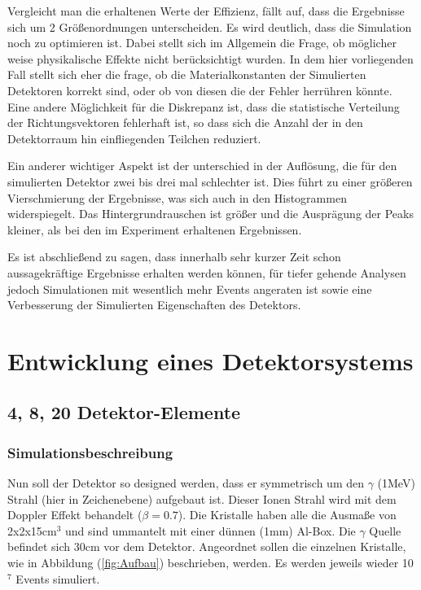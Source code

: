 \documentclass[a4paper,14pt,twoside]{article}
\begin{document}
Vergleicht man die erhaltenen Werte der Effizienz, fällt auf, dass die Ergebnisse sich um 2 Größenordnungen unterscheiden.  Es wird  deutlich, dass die Simulation noch zu optimieren ist. Dabei stellt sich im Allgemein die Frage, ob möglicher weise physikalische Effekte nicht berücksichtigt wurden. In dem hier vorliegenden Fall stellt sich eher die frage, ob die Materialkonstanten der Simulierten Detektoren korrekt sind, oder ob von diesen die der Fehler herrühren könnte.
Eine andere Möglichkeit für die Diskrepanz ist, dass die statistische Verteilung der Richtungsvektoren fehlerhaft ist, so dass sich die Anzahl der in den Detektorraum hin einfliegenden Teilchen reduziert.   

Ein anderer wichtiger Aspekt ist der unterschied in der Auflösung, die für den simulierten Detektor zwei bis drei mal schlechter ist. Dies führt zu einer größeren Vierschmierung der Ergebnisse, was sich auch in den Histogrammen widerspiegelt. Das Hintergrundrauschen ist größer und die Ausprägung der Peaks kleiner, als bei den im Experiment erhaltenen Ergebnissen.

Es ist abschließend zu sagen, dass innerhalb sehr kurzer Zeit schon aussagekräftige Ergebnisse erhalten werden können, für tiefer gehende Analysen jedoch Simulationen mit wesentlich mehr Events angeraten ist sowie eine Verbesserung der Simulierten Eigenschaften des Detektors. 

			
\section{Entwicklung eines Detektorsystems}
	\subsection{4, 8, 20 Detektor-Elemente}			
		\subsubsection{Simulationsbeschreibung}
			Nun soll der Detektor so designed werden, dass er symmetrisch um den $\gamma$ (1MeV) Strahl (hier in Zeichenebene) aufgebaut ist. Dieser Ionen Strahl wird mit dem Doppler Effekt behandelt ($\beta=0.7$). Die Kristalle haben alle die Ausmaße von 2x2x15cm$^3$ und sind ummantelt mit einer dünnen (1mm) Al-Box. Die $\gamma$ Quelle befindet sich 30cm vor dem Detektor. Angeordnet sollen die einzelnen Kristalle, wie in Abbildung (\ref{fig:Aufbau}) beschrieben, werden. Es werden jeweils wieder 10$^7$ Events simuliert. 
			
\end{document}
